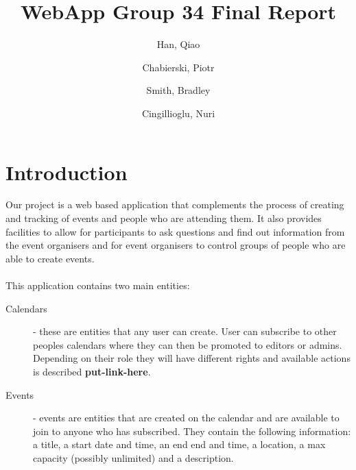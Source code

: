 \documentclass[10pt,a4paper]{article}
\begin{document}
\title{WebApp Group 34 Final Report}
\author{
  Han, Qiao\\
  \and
  Chabierski, Piotr\\
  \and
  Smith, Bradley\\
  \and
  Cingillioglu, Nuri\\
}

\maketitle

\section{Introduction}
Our project is a web based application that complements the process of creating 
and tracking of events and people who are attending them. It also provides 
facilities to allow for participants to ask questions and find out information 
from the event organisers and for event organisers to control groups of people 
who are able to create events. 
\\
\\
\noindent This application contains two main entities:
\begin{description}
\item[Calendars] - these are entities that any user can create. User can 
subscribe to other peoples calendars where they can then be promoted to editors 
or admins. Depending on their role they will have different rights and available 
actions is described \textbf{put-link-here}.
\item[Events] - events are entities that are created on the calendar and are 
available to join to anyone who has subscribed. They contain the following 
information: a title, a start date and time, an end end and time, a location, a 
max capacity (possibly unlimited) and a description.
\end{description}
\end{document}
